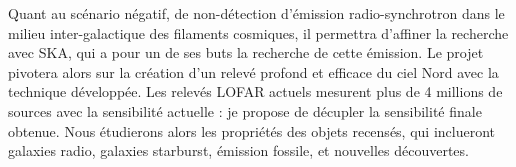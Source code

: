 \pg
Quant au sc\'enario n\'egatif, de non-d\'etection d'\'emission radio-synchrotron dans le milieu inter-galactique des filaments cosmiques, il permettra d'affiner la recherche avec SKA, qui a pour un de ses buts la recherche de cette \'emission. Le projet pivotera alors sur la cr\'eation d'un relev\'e profond et efficace du ciel Nord avec la technique d\'evelopp\'ee. Les relev\'es LOFAR actuels mesurent plus de 4 millions de sources avec la sensibilit\'e actuelle \cite{2022yCat..36590001S} : je propose de d\'ecupler la sensibilit\'e finale obtenue. 
Nous \'etudierons alors les propri\'et\'es des objets recens\'es, qui inclueront galaxies radio, galaxies starburst, \'emission fossile, et nouvelles d\'ecouvertes. %


%



%
%

%
%
%


